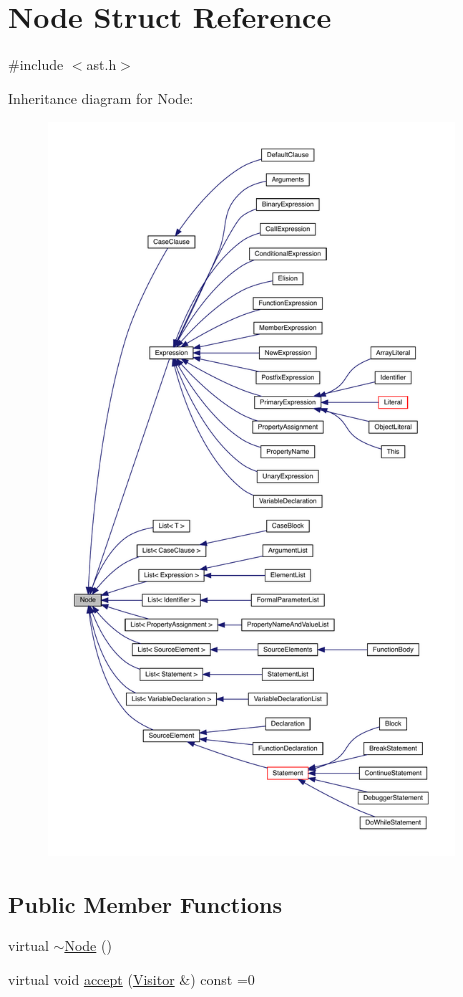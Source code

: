 \hypertarget{struct_node}{}\section{Node Struct Reference}
\label{struct_node}


{\ttfamily \#include $<$ast.\+h$>$}



Inheritance diagram for Node\+:\nopagebreak
\begin{figure}[H]
\begin{center}
\leavevmode
\includegraphics[height=550pt]{struct_node__inherit__graph}
\end{center}
\end{figure}
\subsection*{Public Member Functions}
\begin{DoxyCompactItemize}
\item 
virtual \hyperlink{struct_node_af5e3fa79300bf5f3f2f3ecae6e795a94}{$\sim$\+Node} ()
\item 
virtual void \hyperlink{struct_node_a10bd7af968140bbf5fa461298a969c71}{accept} (\hyperlink{struct_visitor}{Visitor} \&) const =0
\end{DoxyCompactItemize}


